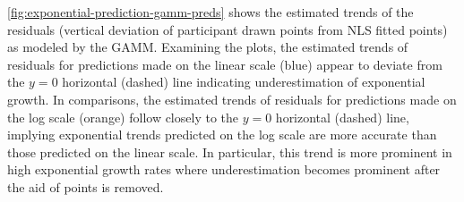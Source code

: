 \documentclass[print]{nuthesis}
\newenvironment{Shaded}{\begin{snugshade}}{\end{snugshade}}
\newcommand{\DecValTok}[1]{\textcolor[rgb]{0.00,0.00,0.81}{#1}}
\newcommand{\FunctionTok}[1]{\textcolor[rgb]{0.00,0.00,0.00}{#1}}
\newcommand{\NormalTok}[1]{#1}
\newcommand{\OtherTok}[1]{\textcolor[rgb]{0.56,0.35,0.01}{#1}}
\newcommand{\SpecialCharTok}[1]{\textcolor[rgb]{0.00,0.00,0.00}{#1}}
\begin{document}
\cref{fig:exponential-prediction-gamm-preds} shows the estimated trends of the residuals (vertical deviation of participant drawn points from NLS fitted points) as modeled by the GAMM.
Examining the plots, the estimated trends of residuals for predictions made on the linear scale (blue) appear to deviate from the \(y=0\) horizontal (dashed) line indicating underestimation of exponential growth.
In comparisons, the estimated trends of residuals for predictions made on the log scale (orange) follow closely to the \(y=0\) horizontal (dashed) line, implying exponential trends predicted on the log scale are more accurate than those predicted on the linear scale.
In particular, this trend is more prominent in high exponential growth rates where underestimation becomes prominent after the aid of points is removed.

\begin{Shaded}
\end{Shaded}
\end{document}
